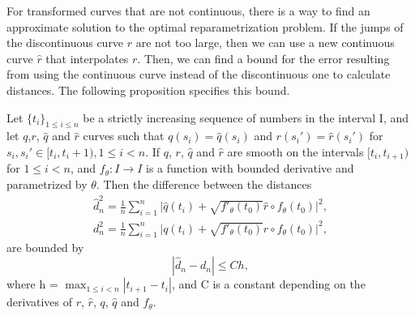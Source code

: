 For transformed curves that are not continuous, there is a way to find an approximate solution to the optimal reparametrization problem. If the jumps of the discontinuous curve \(r\) are not too large, then we can use a new continuous curve \(\hat r\) that interpolates \(r\). Then, we can find a bound for the error resulting from using the continuous curve instead of the discontinuous one to calculate distances. The following proposition specifies this bound. 
\begin{proposition}\label{prop:distance_difference}
  Let \({\{t_i\}}_{1 \leq i\leq n}\) be a strictly increasing sequence of numbers in the interval I, and let \(q\),\(r\), \(\hat q\) and  \(\hat r\) curves such that \(q(s_i)=\hat q(s_i)\) and \(r(s_i')=\hat r(s_i')\) for \(s_i, s_i' \in [t_i, t_i+1), 1\leq i < n\). If  \(q\),  \(r\),   \(\hat q\) and  \(\hat r\) are smooth on the intervals  \([t_i, t_{i+1})\) for  \( 1 \leq i <n\), and  \(f_\theta : I \rightarrow I\) is a function with bounded derivative and parametrized by \( \theta \). Then the difference between the distances
  \begin{eqnarray}
    \hat d_n^2=\frac{1}{n}\sum_{i=1}^{n}\Big|\hat q(t_i) + \sqrt{f'_{\theta}(t_0)} \hat r \circ f_{\theta}(t_0)\Big|^2, \\
    d_n^2=\frac{1}{n}\sum_{i=1}^{n}\Big|q(t_i) + \sqrt{f'_{\theta}(t_0)} r \circ f_{\theta}(t_0)\Big|^2,
  \end{eqnarray}
  are bounded by
  \begin{equation}
    | \hat d_n -d_n | \leq  C h,
  \end{equation}
  where h = \(\max_{1\leq i<n}|t_{i+1} - t_{i} |\), and C is a constant depending on the derivatives of  \(r\),  \(\hat{r}\),  \(q\),  \(\hat q\) and  \(f_{\theta}\).
\end{proposition}
